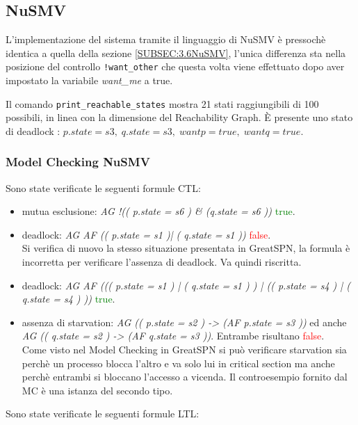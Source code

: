 \documentclass[a4paper]{article}
\begin{document}
\subsection{NuSMV}
L'implementazione del sistema tramite il linguaggio di NuSMV è pressochè identica a quella della sezione \ref{SUBSEC:3.6NuSMV}, l'unica differenza sta nella posizione del controllo \texttt{!want\_other} che questa volta viene effettuato dopo aver impostato la variabile \textit{want\_me} a true.

Il comando \texttt{print\_reachable\_states} mostra 21 stati raggiungibili di 100 possibili, in linea con la dimensione del Reachability Graph.
È presente uno stato di deadlock : $p.state=s3, \; q.state=s3, \; wantp = true, \; wantq = true $. 

\subsubsection{Model Checking NuSMV}
Sono state verificate le seguenti formule CTL:
\begin{itemize}
        \item mutua esclusione: \textit{AG !(( p.state = s6 ) \& (q.state = s6 ))} \textcolor{green}{true}.
        \item deadlock: \textit{AG AF (( p.state = s1 )| ( q.state = s1 ))} \textcolor{red}{false}.\\
		Si verifica di nuovo la stesso situazione presentata in GreatSPN, la formula è incorretta per verificare l'assenza di deadlock. Va quindi riscritta.

        \item deadlock: \textit{AG AF ((( p.state = s1 ) | ( q.state = s1 ) ) | (( p.state = s4 ) | ( q.state = s4 ) ))} \textcolor{green}{true}.\\
        \item assenza di starvation: \textit{AG (( p.state = s2 ) -> (AF p.state = s3 ))} ed anche \textit{AG (( q.state = s2 ) -> (AF q.state = s3 ))}. Entrambe risultano \textcolor{red}{false}.\\
		Come visto nel Model Checking in GreatSPN si può verificare starvation sia perchè un processo blocca l'altro e va solo lui in critical section ma anche perchè entrambi si bloccano l'accesso a vicenda.
		Il controesempio fornito dal MC è una istanza del secondo tipo.
\end{itemize}
Sono state verificate le seguenti formule LTL:
\end{document}
